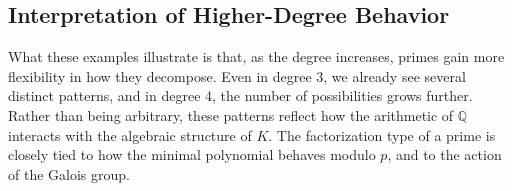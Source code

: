 \subsection{Interpretation of Higher-Degree Behavior}

What these examples illustrate is that, as the degree increases, primes gain more flexibility in how they decompose. Even in degree $3$, we already see several distinct patterns, and in degree $4$, the number of possibilities grows further.
\\
Rather than being arbitrary, these patterns reflect how the arithmetic of $\mathbb{Q}$ interacts with the algebraic structure of $K$. The factorization type of a prime is closely tied to how the minimal polynomial behaves modulo $p$, and to the action of the Galois group.
